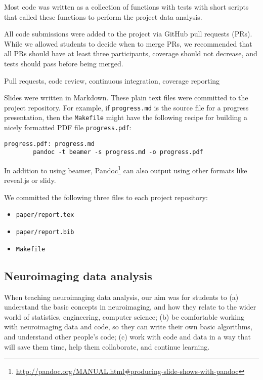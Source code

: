 Most code was written as a collection of functions with tests with short
scripts that called these functions to perform the project data analysis.

All code submissions were added to the project via GitHub pull requests (PRs).
While we allowed students to decide when to merge PRs, we recommended that
all PRs should have at least three participants, coverage should not decrease,
and tests should pass before being merged.

Pull requests, code review, continuous integration, coverage reporting

Slides were written in Markdown.
These plain text files were committed to the project repository.
For example, if \texttt{progress.md} is the source file for a progress presentation,
then the \texttt{Makefile} might have the following recipe for building a nicely
formatted PDF file \texttt{progress.pdf}:
\begin{verbatim}
progress.pdf: progress.md
        pandoc -t beamer -s progress.md -o progress.pdf
\end{verbatim}

In addition to using beamer,
Pandoc\footnote{\url{http://pandoc.org/MANUAL.html\#producing-slide-shows-with-pandoc}}
can also output using other formats like reveal.js or slidy.

We committed the following three files to each project repository:
\begin{itemize}
\item \texttt{paper/report.tex}
\item \texttt{paper/report.bib}
\item \texttt{Makefile}
\end{itemize}

\subsection{Neuroimaging data analysis}\label{analysis}

When teaching neuroimaging data analysis, our aim was for students to
(a) understand the basic concepts in neuroimaging,
and how they relate to the wider world of statistics, engineering, computer science;
(b) be comfortable working with neuroimaging data and code, so they can write
their own basic algorithms, and understand other people's code;
(c) work with code and data in a way that will save them time, help them collaborate,
and continue learning.%

